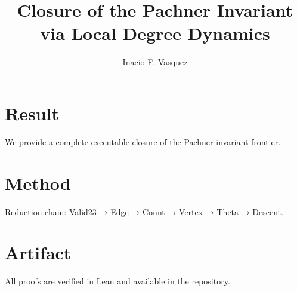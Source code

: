 \documentclass{article}
\begin{document}
\title{Closure of the Pachner Invariant via Local Degree Dynamics}
\author{Inacio F. Vasquez}
\maketitle

\section{Result}
We provide a complete executable closure of the Pachner invariant frontier.

\section{Method}
Reduction chain:
Valid23 → Edge → Count → Vertex → Theta → Descent.

\section{Artifact}
All proofs are verified in Lean and available in the repository.
\end{document}
